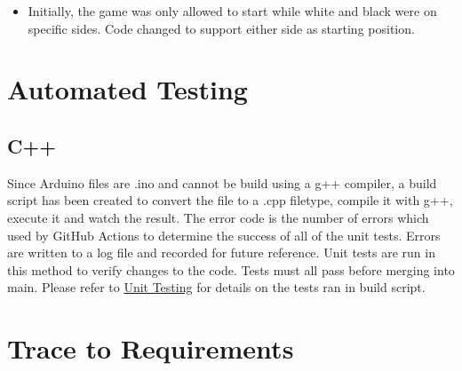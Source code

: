 \documentclass[12pt, titlepage]{article}
\begin{document}
\begin{itemize}
  \item Initially, the game was only allowed to start while white and black were on specific sides. Code changed to support either side as starting position.
\end{itemize}
  

\section{Automated Testing}
\subsection{C++}
  Since Arduino files are .ino and cannot be build using a g++ compiler, a build script has been created to convert the file to a .cpp filetype, compile it with
  g++, execute it and watch the result. The error code is the number of errors which used by GitHub Actions to determine the success of all of the unit tests. Errors
  are written to a log file and recorded for future reference. Unit tests are run in this method to verify changes to the code. Tests must all pass before merging
  into main. Please refer to \hyperref[UnitTest]{Unit Testing} for details on the tests ran in build script.
		
\section{Trace to Requirements}
\end{document}
